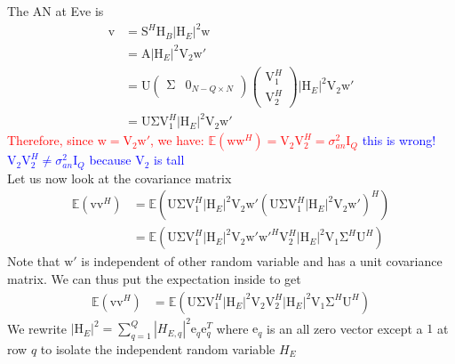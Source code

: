 \documentclass[12pt]{article}
\newcommand{\vect}[1]{\boldsymbol{\mathrm{#1}}}
\newcommand{\mat}[1]{\boldsymbol{\mathrm{#1}}}
\begin{document}
The AN at Eve is
\begin{align*}
	\vect{v}&=	\mat{S}^H \mat{H}_B |\mat{H}_E|^2 \vect{w}\\
	&=\mat{A} |\mat{H}_E|^2 \mat{V}_2 \vect{w}'\\
	&= \mat{U} \begin{pmatrix}
	\mat{\Sigma} & \mat{0}_{N-Q\times N}
	\end{pmatrix}  \begin{pmatrix}
	\mat{V}_1^H\\
	\mat{V}_2^H
	\end{pmatrix} |\mat{H}_E|^2 \mat{V}_2 \vect{w}'\\
	&=\mat{U} \mat{\Sigma}\mat{V}_1^H |\mat{H}_E|^2 \mat{V}_2 \vect{w}'
\end{align*}
\textcolor{red}{Therefore, since $\vect{w} = \mat{V}_2 \vect{w}'$, we have: $\mathbb{E}\left(\vect{w}\vect{w}^H\right) = \mat{V}_2 \mat{V}_2^H =  \sigma^2_{an} \mat{I}_Q$ } \textcolor{blue}{this is wrong! $\mat{V}_2 \mat{V}_2^H \neq   \sigma^2_{an} \mat{I}_Q$ because $\mat{V}_2$ is tall} \\
Let us now look at the covariance matrix
\begin{align*}
	\mathbb{E}\left(\vect{v}\vect{v}^H\right)&=\mathbb{E}\left(\mat{U} \mat{\Sigma}\mat{V}_1^H |\mat{H}_E|^2 \mat{V}_2 \vect{w}'\left(\mat{U} \mat{\Sigma}\mat{V}_1^H |\mat{H}_E|^2 \mat{V}_2 \vect{w}'\right)^H\right)\\
	&=\mathbb{E}\left(\mat{U} \mat{\Sigma}\mat{V}_1^H |\mat{H}_E|^2 \mat{V}_2 \vect{w}'\vect{w}'^H\mat{V}_2^H|\mat{H}_E|^2\mat{V}_1 \mat{\Sigma}^H   \mat{U}^H\right)
\end{align*}
Note that $\vect{w}'$ is independent of other random variable and has a unit covariance matrix. We can thus put the expectation inside to get
\begin{align*}
\mathbb{E}\left(\vect{v}\vect{v}^H\right)&=\mathbb{E}\left(\mat{U} \mat{\Sigma}\mat{V}_1^H |\mat{H}_E|^2 \mat{V}_2 \mat{V}_2^H|\mat{H}_E|^2\mat{V}_1 \mat{\Sigma}^H   \mat{U}^H\right)
\end{align*}
We rewrite $|\mat{H}_E|^2=\sum_{q=1}^Q|H_{E,q}|^2 \vect{e}_q \vect{e}_q^T $ where $\vect{e}_q$ is an all zero vector except a $1$ at row $q$ to isolate the independent random variable $H_E$
\end{document}
